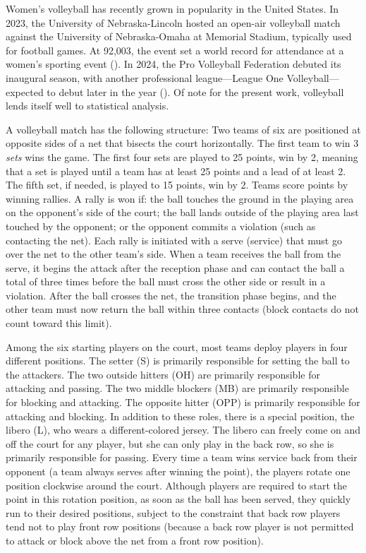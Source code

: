 \documentclass[USenglish]{article}
\theoremstyle{dgthm}
\theoremstyle{dgdef}
\begin{document}
Women's volleyball has recently grown in popularity in the United States. In 2023, the University of Nebraska-Lincoln hosted an open-air volleyball match against the University of Nebraska-Omaha at Memorial Stadium, typically used for football games. At 92,003, the event set a world record for attendance at a women's sporting event (\cite{olson_2023}). In 2024, the Pro Volleyball Federation debuted its inaugural season, with another professional league---League One Volleyball---expected to debut later in the year (\cite{echlin_2024}). Of note for the present work, volleyball lends itself well to statistical analysis.

A volleyball match has the following structure: Two teams of six are positioned at opposite sides of a net that bisects the court horizontally. The first team to win 3 {\it sets} wins the game. The first four sets are played to 25 points, win by 2, meaning that a set is played until a team has at least 25 points and a lead of at least 2. The fifth set, if needed, is played to 15 points, win by 2. Teams score points by winning rallies. A rally is won if: the ball touches the ground in the playing area on the opponent's side of the court; the ball lands outside of the playing area last touched by the opponent; or the opponent commits a violation (such as contacting the net). Each rally is initiated with a serve (service) that must go over the net to the other team's side. When a team receives the ball from the serve, it begins the attack after the reception phase and can contact the ball a total of three times before the ball must cross the other side or result in a violation. After the ball crosses the net, the transition phase begins, and the other team must now return the ball within three contacts (block contacts do not count toward this limit).

Among the six starting players on the court, most teams deploy players in four different positions. The setter (S) is primarily responsible for setting the ball to the attackers. The two outside hitters (OH) are primarily responsible for attacking and passing. The two middle blockers (MB) are primarily responsible for blocking and attacking. The opposite hitter (OPP) is primarily responsible for attacking and blocking. In addition to these roles, there is a special position, the libero (L), who wears a different-colored jersey. The libero can freely come on and off the court for any player, but she can only play in the back row, so she is primarily responsible for passing. Every time a team wins service back from their opponent (a team always serves after winning the point), the players rotate one position clockwise around the court. Although players are required to start the point in this rotation position, as soon as the ball has been served, they quickly run to their desired positions, subject to the constraint that back row players tend not to play front row positions (because a back row player is not permitted to attack or block above the net from a front row position).
\end{document}
